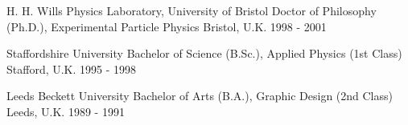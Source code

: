 

\begin{cventries}

    \award
    {H. H. Wills Physics Laboratory, University of Bristol} %
    {Doctor of Philosophy (Ph.D.), Experimental Particle Physics} %
    {Bristol, U.K.} %
    {1998 - 2001} %
    {}

    \award
    {Staffordshire University} %
    {Bachelor of Science (B.Sc.), Applied Physics (1st Class)} %
    {Stafford, U.K.} %
    {1995 - 1998} %
    {}

    \award
    {Leeds Beckett University} %
    {Bachelor of Arts (B.A.), Graphic Design (2nd Class)} %
    {Leeds, U.K.} %
    {1989 - 1991} %
    {}

\end{cventries}